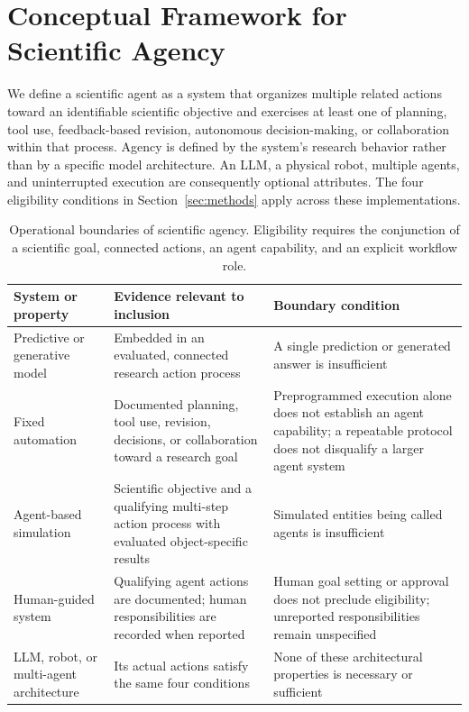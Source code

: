 \section{Conceptual Framework for Scientific Agency}
\label{sec:framework}

We define a scientific agent as a system that organizes multiple related actions toward an identifiable scientific objective and exercises at least one of planning, tool use, feedback-based revision, autonomous decision-making, or collaboration within that process. Agency is defined by the system's research behavior rather than by a specific model architecture. An LLM, a physical robot, multiple agents, and uninterrupted execution are consequently optional attributes. The four eligibility conditions in Section~\ref{sec:methods} apply across these implementations.

\begin{table}[H]
\caption{Operational boundaries of scientific agency. Eligibility requires the conjunction of a scientific goal, connected actions, an agent capability, and an explicit workflow role.}
\label{tab:agent-boundaries}
\small
\begin{tabularx}{\textwidth}{@{}p{}XX@{}}
\toprule
System or property & Evidence relevant to inclusion & Boundary condition \\
\midrule
Predictive or generative model & Embedded in an evaluated, connected research action process & A single prediction or generated answer is insufficient \\
Fixed automation & Documented planning, tool use, revision, decisions, or collaboration toward a research goal & Preprogrammed execution alone does not establish an agent capability; a repeatable protocol does not disqualify a larger agent system \\
Agent-based simulation & Scientific objective and a qualifying multi-step action process with evaluated object-specific results & Simulated entities being called agents is insufficient \\
Human-guided system & Qualifying agent actions are documented; human responsibilities are recorded when reported & Human goal setting or approval does not preclude eligibility; unreported responsibilities remain unspecified \\
LLM, robot, or multi-agent architecture & Its actual actions satisfy the same four conditions & None of these architectural properties is necessary or sufficient \\
\bottomrule
\end{tabularx}
\end{table}

